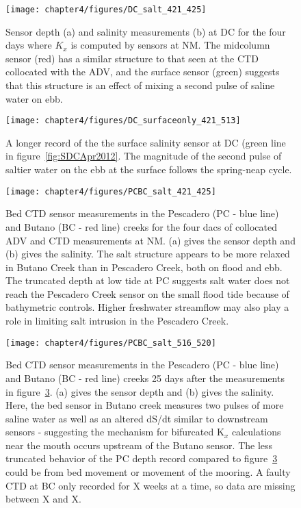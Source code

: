 \begin{figure}
	\texttt{[image: chapter4/figures/DC\_salt\_421\_425]}
	\caption{Sensor depth (a) and salinity measurements (b) at DC for the four days where $K_x$ is computed by sensors at NM. The midcolumn sensor (red) has a similar structure to that seen at the CTD collocated with the ADV, and the surface sensor (green) suggests that this structure is an effect of mixing a second pulse of saline water on ebb.} \label{fig:SDCApr2012} \label{fig:DC_salt_421_425}
\end{figure}


\begin{figure}
	\texttt{[image: chapter4/figures/DC\_surfaceonly\_421\_513]}
	\caption{A longer record of the the surface salinity sensor at DC (green line in figure~\ref{fig:SDCApr2012}. The magnitude of the second pulse of saltier water on the ebb at the surface follows the spring-neap cycle.} \label{fig:SsurfLT}
\end{figure}


\begin{figure}
	\texttt{[image: chapter4/figures/PCBC\_salt\_421\_425]}
	\caption{Bed CTD sensor measurements in the Pescadero (PC - blue line) and Butano (BC  - red line) creeks for the four dacs of collocated ADV and CTD measurements at NM. (a) gives the sensor depth and (b) gives the salinity. The salt structure appears to be more relaxed in Butano Creek than in Pescadero Creek, both on flood and ebb. The truncated depth at low tide at PC suggests salt water does not reach the Pescadero Creek sensor on the small flood tide because of bathymetric controls. Higher freshwater streamflow may also play a role in limiting salt intrusion in the Pescadero Creek.} \label{fig:PCBC421:425}
\end{figure}



\begin{figure}
	\texttt{[image: chapter4/figures/PCBC\_salt\_516\_520]}
	\caption{Bed CTD sensor measurements in the Pescadero (PC - blue line) and Butano (BC - red line) creeks 25 days after the measurements in figure~\ref{fig:PCBC421:425}. (a) gives the sensor depth and (b) gives the salinity. Here, the bed sensor in Butano creek measures two pulses of more saline water as well as an altered dS/dt similar to downstream sensors - suggesting the mechanism for bifurcated K$_x$ calculations near the mouth occurs upstream of the Butano sensor. The less truncated behavior of the PC depth record compared to figure~\ref{fig:PCBC421:425} could be from bed movement or movement of the mooring. A faulty CTD at BC only recorded for X weeks at a time, so data are missing between X and X.}  \label{fig:PCBC511:516}
\end{figure}


